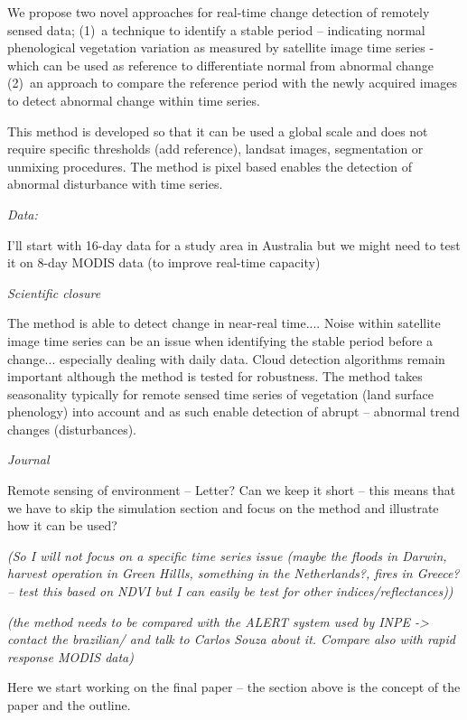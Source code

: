 \documentclass[authoryear,preprint,review,10pt]{elsarticle}
\newcommand{\readme}[1]{\emph{\marginpar{README} (#1)}}
\begin{document}
We propose two novel approaches for real-time change detection of remotely
sensed data; (1)~a technique to identify a stable period -- indicating normal
phenological vegetation variation as measured by satellite image time series -
which can be used as reference to differentiate normal from abnormal change
(2)~an approach to compare the reference period with the newly acquired images
to detect abnormal change within time series.

This method is developed so that it can be used a global scale and does not
require specific thresholds (add reference), landsat images, segmentation or
unmixing procedures. The method is pixel based enables the detection of abnormal
disturbance with time series.

\emph{Data:}

I'll start with 16-day data for a study area in Australia but we might need to
test it on 8-day MODIS data (to improve real-time capacity)

\emph{Scientific closure}

The method is able to detect change in near-real time.... Noise within satellite
image time series can be an issue when identifying the stable period before a
change... especially dealing with daily data. Cloud detection algorithms remain
important although the method is tested for robustness. The method takes
seasonality typically for remote sensed time series of vegetation (land surface
phenology) into account and as such enable detection of abrupt -- abnormal trend
changes (disturbances).

\emph{Journal}

Remote sensing of environment -- Letter? Can we keep it short -- this means that
we have to skip the simulation section and focus on the method and illustrate
how it can be used? 

\readme{So I will not focus on a specific time series issue (maybe the floods in Darwin,
harvest operation in Green Hillls, something in the Netherlands?, fires in
Greece? -- test this based on NDVI but I can easily be test for other
indices/reflectances)}

\readme{the method needs to be compared with the ALERT system used by INPE -> contact
the brazilian/ and talk to Carlos Souza about it. Compare also with rapid
response MODIS data}

\newpage

Here we start working on the final paper -- the section above is the concept of
the paper and the outline.
\end{document}
